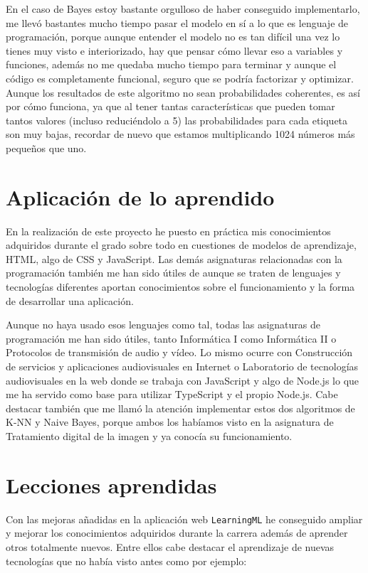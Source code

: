 \documentclass[a4paper, 12pt]{book}
\begin{document}
En el caso de Bayes estoy bastante orgulloso de haber conseguido implementarlo, me llevó bastantes mucho tiempo pasar el modelo en sí a lo que es lenguaje de programación, porque aunque entender el modelo no es tan difícil una vez lo tienes muy visto e interiorizado, hay que pensar cómo llevar eso a variables y funciones, además no me quedaba mucho tiempo para terminar y aunque el código es completamente funcional, seguro que se podría factorizar y optimizar. Aunque los resultados de este algoritmo no sean probabilidades coherentes, es así por cómo funciona, ya que al tener tantas características que pueden tomar tantos valores (incluso reduciéndolo a 5) las probabilidades para cada etiqueta son muy bajas, recordar de nuevo que estamos multiplicando 1024 números más pequeños que uno.


\section{Aplicación de lo aprendido}
\label{sec:aplicacion}

En la realización de este proyecto he puesto en práctica mis conocimientos adquiridos durante el grado sobre todo en cuestiones de modelos de aprendizaje, HTML, algo de CSS y JavaScript. Las demás asignaturas relacionadas con la programación también me han sido útiles de aunque se traten de lenguajes y tecnologías diferentes aportan conocimientos sobre el funcionamiento y la forma de desarrollar una aplicación.
 
Aunque no haya usado esos lenguajes como tal, todas las asignaturas de programación me han sido útiles, tanto Informática I como Informática II o Protocolos de transmisión de audio y vídeo. Lo mismo ocurre con Construcción de servicios y aplicaciones audiovisuales en Internet o Laboratorio de tecnologías audiovisuales en la web donde se trabaja con JavaScript y algo de Node.js lo que me ha servido como base para utilizar TypeScript y el propio Node.js. Cabe destacar también que me llamó la atención implementar estos dos algoritmos de K-NN y Naive Bayes, porque ambos los habíamos visto en la asignatura de Tratamiento digital de la imagen y ya conocía su funcionamiento.

\section{Lecciones aprendidas}
\label{sec:lecciones_aprendidas}

Con las mejoras añadidas en la aplicación web \texttt{LearningML} he conseguido ampliar y mejorar los conocimientos adquiridos durante la carrera además de aprender otros totalmente nuevos. Entre ellos cabe destacar el aprendizaje de nuevas tecnologías que no había visto antes como por ejemplo:
\end{document}
